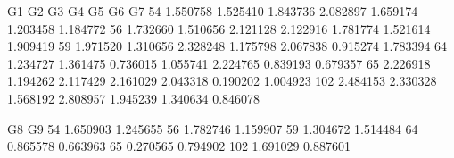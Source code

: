 \documentclass[letterpaper,10pt,english]{jupyterBook}
\begin{document}
\begin{sphinxVerbatim}[commandchars=\\\{\}]
           G1        G2        G3        G4        G5        G6        G7  \PYGZbs{}
54  \PYGZhy{}1.550758 \PYGZhy{}1.525410 \PYGZhy{}1.843736 \PYGZhy{}2.082897 \PYGZhy{}1.659174 \PYGZhy{}1.203458 \PYGZhy{}1.184772   
56  \PYGZhy{}1.732660 \PYGZhy{}1.510656 \PYGZhy{}2.121128 \PYGZhy{}2.122916 \PYGZhy{}1.781774 \PYGZhy{}1.521614 \PYGZhy{}1.909419   
59  \PYGZhy{}1.971520 \PYGZhy{}1.310656 \PYGZhy{}2.328248 \PYGZhy{}1.175798 \PYGZhy{}2.067838 \PYGZhy{}0.915274 \PYGZhy{}1.783394   
64  \PYGZhy{}1.234727 \PYGZhy{}1.361475 \PYGZhy{}0.736015 \PYGZhy{}1.055741 \PYGZhy{}2.224765 \PYGZhy{}0.839193 \PYGZhy{}0.679357   
65  \PYGZhy{}2.226918 \PYGZhy{}1.194262 \PYGZhy{}2.117429 \PYGZhy{}2.161029 \PYGZhy{}2.043318 \PYGZhy{}0.190202 \PYGZhy{}1.004923   
102 \PYGZhy{}2.484153 \PYGZhy{}2.330328 \PYGZhy{}1.568192 \PYGZhy{}2.808957 \PYGZhy{}1.945239 \PYGZhy{}1.340634 \PYGZhy{}0.846078   

           G8        G9  
54  \PYGZhy{}1.650903 \PYGZhy{}1.245655  
56  \PYGZhy{}1.782746 \PYGZhy{}1.159907  
59  \PYGZhy{}1.304672 \PYGZhy{}1.514484  
64  \PYGZhy{}0.865578 \PYGZhy{}0.663963  
65  \PYGZhy{}0.270565 \PYGZhy{}0.794902  
102 \PYGZhy{}1.691029 \PYGZhy{}0.887601  
\end{sphinxVerbatim}

\begin{sphinxVerbatim}[commandchars=\\\{\}]
   
\end{sphinxVerbatim}

\begin{sphinxVerbatim}[commandchars=\\\{\}]
  
\PYG{p}{[}\PYG{p}{]}
\end{sphinxVerbatim}
\end{document}

